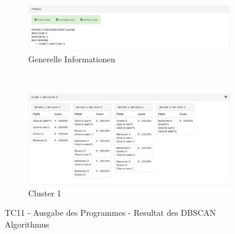 \begin{figure}[H]
	\begin{subfigure}[t]{1\textwidth}
		\centering
		\includegraphics[width=1\textwidth]{images/tc11-dbscan-1}
		\caption{Generelle Informationen}
		\label{fig:testingfazit:testing:testcases:11-1-1}
	\end{subfigure} \\
	\begin{subfigure}[t]{1\textwidth}
		\centering
		\includegraphics[width=1\textwidth]{images/tc11-dbscan-2}
		\caption{Cluster 1}
		\label{fig:testingfazit:testing:testcases:11-1-2}
	\end{subfigure}
	\caption{TC11 - Ausgabe des Programmes - Resultat des DBSCAN Algorithmus}
	\label{fig:testingfazit:testing:testcases:11-1}
\end{figure}

